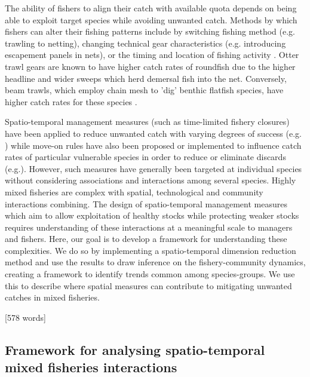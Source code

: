 \documentclass{nature}
\begin{document}
\begin{linenumbers}
The ability of fishers to align their catch with available quota depends on
being able to exploit target species while avoiding unwanted catch. Methods by
which fishers can alter their fishing patterns include by switching fishing
method (e.g. trawling to netting), changing technical gear characteristics
(e.g.  introducing escapement panels in nets), or the timing and location of
fishing activity \cite{Fulton2011b, vanPutten2012a}. Otter trawl gears are
known to have higher catch rates of roundfish due to the higher headline and
wider sweeps which herd demersal fish into the net. Conversely, beam trawls,
which employ chain mesh to 'dig' benthic flatfish species, have higher catch
rates for these species \cite{Fraser2008}.

Spatio-temporal management measures (such as time-limited fishery closures)
have been applied to reduce unwanted catch with varying degrees of success
(e.g.  \cite{Needle2011, Holmes2011, Beare2010, Dinmore2003}) while move-on
rules have also been proposed or implemented to influence catch rates of
particular vulnerable species in order to reduce or eliminate discards
(e.g.\cite{Gardner2008, Dunn2011, Dunn2014a}). However, such measures have
generally been targeted at individual species without considering associations
and interactions among several species. Highly mixed fisheries are complex with
spatial, technological and community interactions combining. The design of
spatio-temporal management measures which aim to allow exploitation of healthy
stocks while protecting weaker stocks requires understanding of these
interactions at a meaningful scale to managers and fishers. Here, our goal is
to develop a framework for understanding these complexities. We do so by
implementing a spatio-temporal dimension reduction method and use the results
to draw inference on the fishery-community dynamics, creating a framework to
identify trends common among species-groups. We use this to describe where
spatial measures can contribute to mitigating unwanted catches in mixed
fisheries.

[578 words]

\subsection{Framework for analysing spatio-temporal mixed fisheries
	interactions}


\end{linenumbers}
\end{document}
